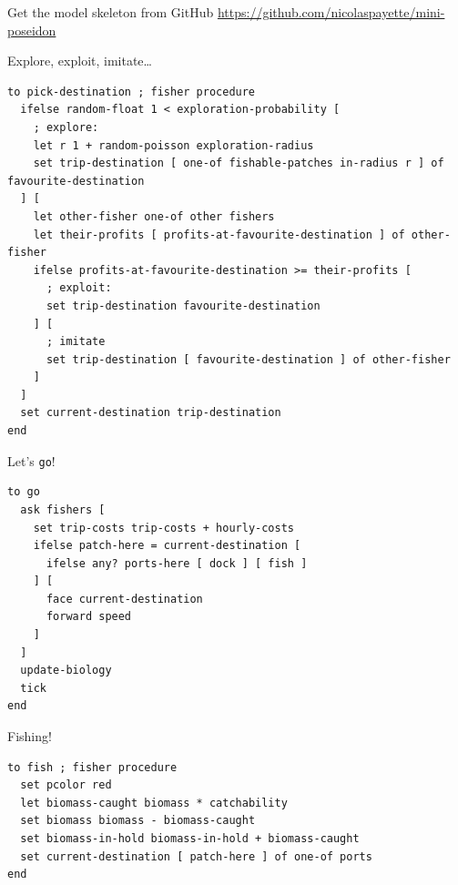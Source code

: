 \documentclass[table, 14pt, aspectratio=169]{beamer}
\begin{document}
\begin{frame}[t]
\end{frame}

\begin{frame}[fragile=singleslide]{Get the model skeleton from GitHub}
  \Large
  \centering
  \vfill
  \url{https://github.com/nicolaspayette/mini-poseidon}
  \vfill
\end{frame}

\begin{frame}[fragile=singleslide]{Explore, exploit, imitate\ldots}\small
  \begin{adjustbox}{max height=0.8\textheight, max width = \linewidth}
    \begin{verbatim}
to pick-destination ; fisher procedure
  ifelse random-float 1 < exploration-probability [
    ; explore:
    let r 1 + random-poisson exploration-radius
    set trip-destination [ one-of fishable-patches in-radius r ] of favourite-destination
  ] [
    let other-fisher one-of other fishers
    let their-profits [ profits-at-favourite-destination ] of other-fisher
    ifelse profits-at-favourite-destination >= their-profits [
      ; exploit:
      set trip-destination favourite-destination
    ] [
      ; imitate
      set trip-destination [ favourite-destination ] of other-fisher
    ]
  ]
  set current-destination trip-destination
end
    \end{verbatim}  
  \end{adjustbox}
\end{frame}


\begin{frame}[fragile=singleslide]{Let's \texttt{go}!}
  \begin{adjustbox}{max height=0.8\textheight, max width = \linewidth}
    \begin{verbatim}
to go
  ask fishers [
    set trip-costs trip-costs + hourly-costs
    ifelse patch-here = current-destination [
      ifelse any? ports-here [ dock ] [ fish ]
    ] [
      face current-destination
      forward speed
    ]
  ]
  update-biology
  tick
end
    \end{verbatim}
  \end{adjustbox}
\end{frame}

\begin{frame}[fragile=singleslide]{Fishing!}
  \begin{adjustbox}{max height=0.8\textheight, max width = \linewidth}
    \begin{verbatim}
to fish ; fisher procedure
  set pcolor red
  let biomass-caught biomass * catchability
  set biomass biomass - biomass-caught
  set biomass-in-hold biomass-in-hold + biomass-caught
  set current-destination [ patch-here ] of one-of ports
end
    \end{verbatim}
  \end{adjustbox}
\end{frame}
\end{document}
